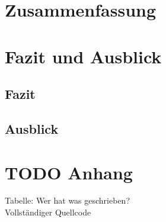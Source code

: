 \documentclass[appendixprefix,a4paper,bibliography=totoc,twoside=true,11pt,DIV=11,BCOR=6mm,headsepline,pointlessnumbers]{scrbook}
\begin{document}
\chapter{Zusammenfassung}
\chapter{Fazit und Ausblick}
\section{Fazit}
\section{Ausblick}
\chapter{TODO Anhang}
Tabelle: Wer hat was geschrieben?\\
Vollständiger Quellcode
\end{document}
